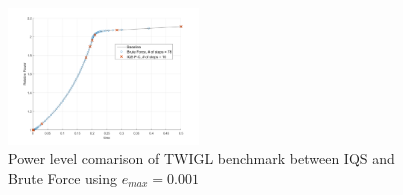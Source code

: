 \documentclass{anstrans}
\begin{document}
%

\begin{figure}[!htbp]
\centering
\includegraphics[width=0.45\textwidth]{figures/TWIGL_power_plot.png}
\caption{Power level comarison of TWIGL benchmark between IQS and Brute Force using $e_{max} = 0.001$}
\label{fig:TWIGL_power}
\end{figure}
\end{document}
